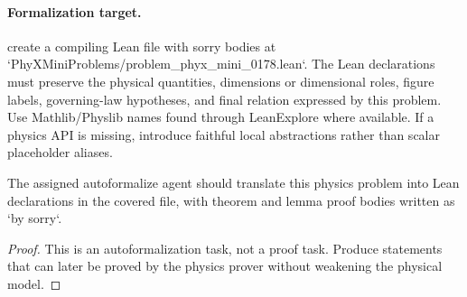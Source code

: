 \paragraph{Formalization target.}
create a compiling Lean file with sorry bodies at `PhyXMiniProblems/problem\_phyx\_mini\_0178.lean`. The Lean declarations must preserve the physical quantities, dimensions or dimensional roles, figure labels, governing-law hypotheses, and final relation expressed by this problem.
Use Mathlib/Physlib names found through LeanExplore where available. If a physics API is missing, introduce faithful local abstractions rather than scalar placeholder aliases.

\begin{theorem}
\label{thm:physics:phyx_mini_0178:target}
The assigned autoformalize agent should translate this physics problem into Lean declarations in the covered file, with theorem and lemma proof bodies written as `by sorry`.
\end{theorem}
\begin{proof}
This is an autoformalization task, not a proof task. Produce statements that can later be proved by the physics prover without weakening the physical model.
\end{proof}

